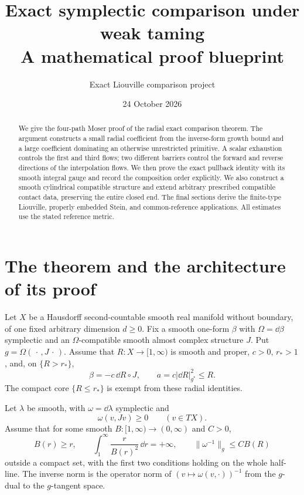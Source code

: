 
\title{Exact symplectic comparison under weak taming\\[5pt]
\large A mathematical proof blueprint}
\author{Exact Liouville comparison project}
\date{24 October 2026}

\maketitle
\begin{abstract}
We give the four-path Moser proof of the radial exact comparison
theorem. The argument constructs a small radial coefficient from the
inverse-form growth bound and a large coefficient dominating an
otherwise unrestricted primitive. A scalar exhaustion controls the
first and third flows; two different barriers control the forward
and reverse directions of the interpolation flows. We then prove the
exact pullback identity with its smooth integral gauge and record
the composition order explicitly. We also construct a smooth
cylindrical compatible structure and extend arbitrary prescribed
compatible contact data, preserving the entire closed end. The final sections derive the
finite-type Liouville, properly embedded Stein, and common-reference
applications. All estimates use the stated reference metric.
\end{abstract}

\section{The theorem and the architecture of its proof}
Let $X$ be a Hausdorff second-countable smooth real manifold without
boundary, of one fixed arbitrary dimension $d\ge0$.
Fix a smooth one-form $\beta$ with
$\Omega=\dd\beta$ symplectic and an $\Omega$-compatible smooth almost
complex structure $J$. Put $g=\Omega(\,\cdot\,,J\,\cdot\,)$.
Assume that $R:X\to[1,\infty)$ is smooth and proper, $c>0$, $r_*>1$,
and, on $\{R>r_*\}$,
\begin{equation}\label{eq:radial}
 \beta=-c\,\dd R\circ J,\qquad
 a=c|\dd R|_{g^*}^2\le R.
\end{equation}
The compact core $\{R\le r_*\}$ is exempt from these radial identities.

Let $\lambda$ be smooth, with $\omega=\dd\lambda$ symplectic and
\[
 \omega(v,Jv)\ge0\qquad(v\in TX).
\]
Assume that for some smooth $B:[1,\infty)\to(0,\infty)$ and $C>0$,
\begin{equation}\label{eq:growth}
 B(r)\ge r,\qquad
 \int_1^\infty\frac{r}{B(r)^2}\,\dd r=+\infty,\qquad
 \|\omega^{-1}\|_g\le C B(R)
\end{equation}
outside a compact set, with the first two conditions holding on
the whole half-line. The inverse norm is the operator norm of
$(v\mapsto\omega(v,\cdot))^{-1}$ from the $g$-dual to the $g$-tangent
space.

